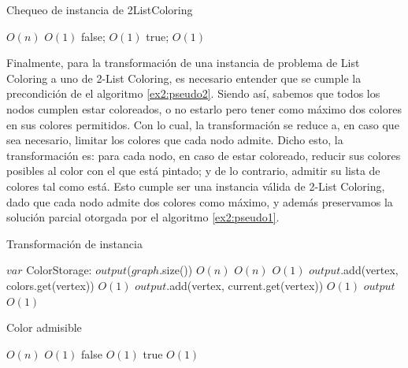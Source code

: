 \documentclass{article}
\theoremstyle{definition}
\theoremstyle{remark}
\begin{document}
\begin{algorithm}
\caption{Chequeo de instancia de 2ListColoring}
\label{ex2:pseudo2}

\begin{algorithmic}
 \Comment $O(n)$
     \Comment $O(1)$
        \State \Return false; \Comment $O(1)$
    \EndIf
\EndFor
\State \Return true; \Comment $O(1)$
\EndFunction
\end{algorithmic}
\end{algorithm}


Finalmente, para la transformación de una instancia de problema de List Coloring a uno de 2-List Coloring, es necesario entender que se cumple la precondición de el algoritmo \ref{ex2:pseudo2}. Siendo así, sabemos que todos los nodos cumplen estar coloreados, o no estarlo pero tener como máximo dos colores en sus colores permitidos. Con lo cual, la transformación se reduce a, en caso que sea necesario, limitar los colores que cada nodo admite.
Dicho esto, la transformación es: para cada nodo, en caso de estar coloreado, reducir sus colores posibles al color con el que está pintado; y de lo contrario, admitir su lista de colores tal como está.
Esto cumple ser una instancia válida de 2-List Coloring, dado que cada nodo admite dos colores como máximo, y además preservamos la solución parcial otorgada por el algoritmo \ref{ex2:pseudo1}.


\begin{algorithm}
\caption{Transformación de instancia}
\label{ex2:pseudo3}

\begin{algorithmic}
\State $var$ ColorStorage: $output$($graph$.size()) \Comment $O(n)$
 \Comment $O(n)$
     \Comment $O(1)$
        \State $output$.add(vertex, colors.get(vertex)) \Comment $O(1)$
    \Else
        \State $output$.add(vertex, current.get(vertex)) \Comment $O(1)$
    \EndIf
\EndFor
\State \Return $output$ \Comment $O(1)$
\EndFunction
\end{algorithmic}
\end{algorithm}

\begin{algorithm}
\caption{Color admisible}
\label{ex2:pseudo3}

\begin{algorithmic}
 \Comment $O(n)$
     \Comment $O(1)$
        \State \Return false \Comment $O(1)$
    \EndIf
\EndFor
\State \Return true \Comment $O(1)$
\EndFunction
\end{algorithmic}
\end{algorithm}
\end{document}
